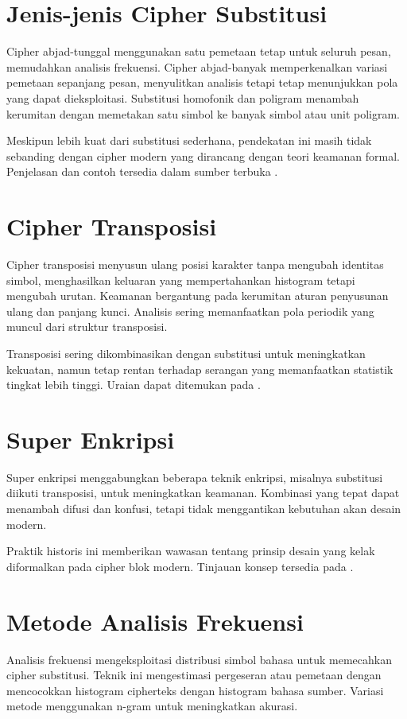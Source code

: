 \documentclass[../main.tex]{subfiles}
\begin{document}
\section{Jenis-jenis Cipher Substitusi}
Cipher abjad-tunggal menggunakan satu pemetaan tetap untuk seluruh pesan, memudahkan analisis frekuensi. Cipher abjad-banyak memperkenalkan variasi pemetaan sepanjang pesan, menyulitkan analisis tetapi tetap menunjukkan pola yang dapat dieksploitasi. Substitusi homofonik dan poligram menambah kerumitan dengan memetakan satu simbol ke banyak simbol atau unit poligram.

Meskipun lebih kuat dari substitusi sederhana, pendekatan ini masih tidak sebanding dengan cipher modern yang dirancang dengan teori keamanan formal. Penjelasan dan contoh tersedia dalam sumber terbuka \parencite{menezes1996handbook}.

\section{Cipher Transposisi}
Cipher transposisi menyusun ulang posisi karakter tanpa mengubah identitas simbol, menghasilkan keluaran yang mempertahankan histogram tetapi mengubah urutan. Keamanan bergantung pada kerumitan aturan penyusunan ulang dan panjang kunci. Analisis sering memanfaatkan pola periodik yang muncul dari struktur transposisi.

Transposisi sering dikombinasikan dengan substitusi untuk meningkatkan kekuatan, namun tetap rentan terhadap serangan yang memanfaatkan statistik tingkat lebih tinggi. Uraian dapat ditemukan pada \textcite{menezes1996handbook}.

\section{Super Enkripsi}
Super enkripsi menggabungkan beberapa teknik enkripsi, misalnya substitusi diikuti transposisi, untuk meningkatkan keamanan. Kombinasi yang tepat dapat menambah difusi dan konfusi, tetapi tidak menggantikan kebutuhan akan desain modern.

Praktik historis ini memberikan wawasan tentang prinsip desain yang kelak diformalkan pada cipher blok modern. Tinjauan konsep tersedia pada \textcite{menezes1996handbook}.

\section{Metode Analisis Frekuensi}
Analisis frekuensi mengeksploitasi distribusi simbol bahasa untuk memecahkan cipher substitusi. Teknik ini mengestimasi pergeseran atau pemetaan dengan mencocokkan histogram cipherteks dengan histogram bahasa sumber. Variasi metode menggunakan n-gram untuk meningkatkan akurasi.
\end{document}
